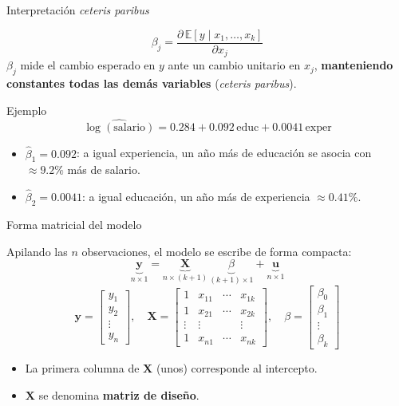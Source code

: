 \documentclass{beamer}
\begin{document}
\begin{frame}{Interpretación \emph{ceteris paribus}}

\begin{tcolorbox}[colback=blue!5!white, colframe=blue!75!black, title=Efecto parcial]
\[
\beta_j = \frac{\partial \, \mathbb{E}[y \mid x_1,\dots,x_k]}{\partial x_j}
\]
$\beta_j$ mide el cambio esperado en $y$ ante un cambio unitario en $x_j$, \textbf{manteniendo constantes todas las demás variables} (\emph{ceteris paribus}).
\end{tcolorbox}

\pause

\begin{exampleblock}{Ejemplo}
\[
\widehat{\log(\text{salario})} = 0.284 + 0.092\,\text{educ} + 0.0041\,\text{exper}
\]
\begin{itemize}
    \item $\hat{\beta}_1 = 0.092$: a igual experiencia, un año más de educación se asocia con $\approx 9.2\%$ más de salario.
    \item $\hat{\beta}_2 = 0.0041$: a igual educación, un año más de experiencia $\approx 0.41\%$.
\end{itemize}
\end{exampleblock}

\end{frame}

\begin{frame}{Forma matricial del modelo}

Apilando las $n$ observaciones, el modelo se escribe de forma compacta:
\[
\underbrace{\mathbf{y}}_{n\times 1} = \underbrace{\mathbf{X}}_{n\times (k+1)}\, \underbrace{\beta}_{(k+1)\times 1} + \underbrace{\mathbf{u}}_{n\times 1}
\]
\[
\mathbf{y} =
\begin{bmatrix} y_1 \\ y_2 \\ \vdots \\ y_n \end{bmatrix},\quad
\mathbf{X} =
\begin{bmatrix}
1 & x_{11} & \cdots & x_{1k}\\
1 & x_{21} & \cdots & x_{2k}\\
\vdots & \vdots & & \vdots\\
1 & x_{n1} & \cdots & x_{nk}
\end{bmatrix},\quad
\beta =
\begin{bmatrix} \beta_0 \\ \beta_1 \\ \vdots \\ \beta_k \end{bmatrix}
\]

\begin{itemize}
    \item La primera columna de $\mathbf{X}$ (unos) corresponde al intercepto.
    \item $\mathbf{X}$ se denomina \textbf{matriz de diseño}.
\end{itemize}

\end{frame}
\end{document}
